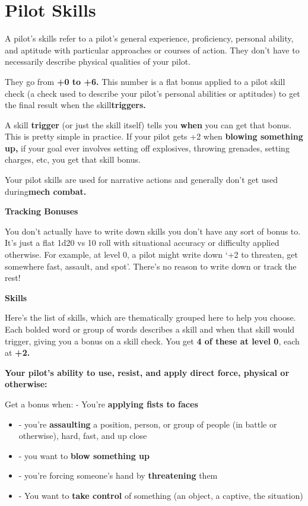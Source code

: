 \section{Pilot Skills}

A pilot’s skills refer to a pilot’s general experience, proficiency, personal ability, and aptitude with
particular approaches or courses of action. They don’t have to necessarily describe physical
qualities of your pilot.

They go from \textbf{+0 to +6.} This number is a flat bonus applied to a pilot skill check (a check used to
describe your pilot’s personal abilities or aptitudes) to get the final result when the skill\textbf{triggers.} 

A skill \textbf{trigger} (or just the skill itself) tells you \textbf{when} you can get that bonus. This is pretty simple in
practice. If your pilot gets +2 when \textbf{blowing something up,} if your goal ever involves setting off
explosives, throwing grenades, setting charges, etc, you get that skill bonus.

Your pilot skills are used for narrative actions and generally don’t get used during\textbf{mech combat.} 

\begin{center}
\textbf{Tracking Bonuses}
\end{center}


You don’t actually have to write down skills you don’t have any sort of bonus to. It’s just a flat
1d20 vs 10 roll with situational accuracy or difficulty applied otherwise. For example, at level 0, a
pilot might write down ‘+2 to threaten, get somewhere fast, assault, and spot’. There’s no reason
to write down or track the rest!


\begin{center}
\textbf{Skills}
\end{center}

Here’s the list of skills, which are thematically grouped here to help you choose. Each bolded
word or group of words describes a skill and when that skill would trigger, giving you a bonus on a
skill check. You get \textbf{4 of these at level 0}, each at \textbf{+2.} 

\textbf{Your pilot’s ability to use, resist, and apply direct force, physical or otherwise:}

Get a bonus when: - You’re \textbf{applying fists to faces}
\begin{itemize}
\item - you’re \textbf{assaulting} a position, person, or group of people (in battle or otherwise), hard, fast, and up close
\item - you want to \textbf{blow something up}
\item - you’re forcing someone’s hand by \textbf{threatening} them
\item - You want to \textbf{take control} of something (an object, a captive, the situation)
\end{itemize}  


